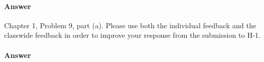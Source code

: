 \documentclass{article}
\begin{document}
\paragraph{Answer}
\todo{}


\collab{\todo{}}

Chapter 1, Problem 9, part (a). Please use both the individual feedback and the
classwide feedback in order to improve your response from the submission to H-1.

\paragraph{Answer}
\todo{}
\end{document}
